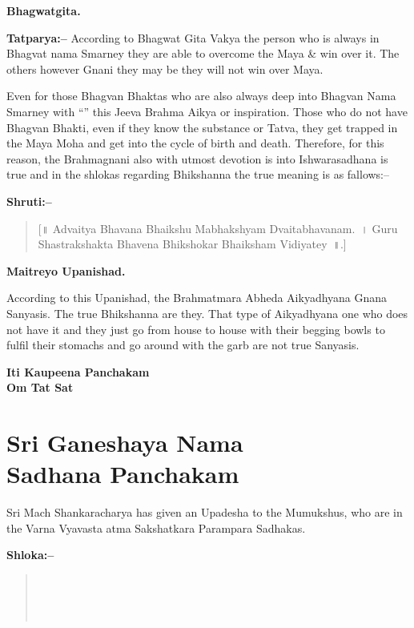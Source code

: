 \begin{flushright}
\textbf{Bhagwatgita.}
\end{flushright}

\textbf{Tatparya:–} According to Bhagwat Gita Vakya the person who is always in Bhagvat nama Smarney they are able to overcome the Maya \& win over it. The others however Gnani they may be they will not win over Maya.

Even for those Bhagvan Bhaktas who are also always deep into Bhagvan Nama Smarney with “” this Jeeva Brahma Aikya or inspiration. Those who do not have Bhagvan Bhakti, even if they know the substance or Tatva, they get trapped in the Maya Moha and get into the cycle of birth and death. Therefore, for this reason, the Brahmagnani also with utmost devotion is into Ishwarasadhana is true and in the shlokas regarding Bhikshanna the true meaning is as fallows:–

\textbf{Shruti:–}

\begin{verse}
[॥ Advaitya Bhavana Bhaikshu Mabhakshyam Dvaitabhavanam.~। Guru Shastrakshakta Bhavena Bhikshokar Bhaiksham Vidiyatey~॥.]
\end{verse}

\begin{flushright}
\textbf{Maitreyo Upanishad.}
\end{flushright}

According to this Upanishad, the Brahmatmara Abheda Aikyadhyana Gnana Sanyasis. The true Bhikshanna are they. That type of Aikyadhyana one who does not have it and they just go from house to house with their begging bowls to fulfil their stomachs and go around with the garb are not true Sanyasis.

\begin{center}
\textbf{Iti Kaupeena Panchakam\\ Om Tat Sat}
\end{center}

\chapter{Sri Ganeshaya Nama\\ Sadhana Panchakam}

Sri Mach Shankaracharya has given an Upadesha to the Mumukshus, who are in the Varna Vyavasta atma Sakshatkara Parampara Sadhakas.

\textbf{Shloka:–}

\begin{verse}
 \\\\\\ 
\end{verse}

